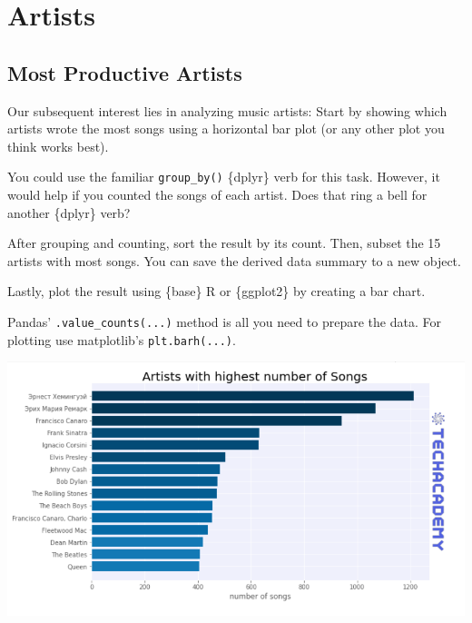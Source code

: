 \documentclass[
  11pt,
]{book}
\newenvironment{tips}[1]
  {
  \begin{itemize}
  \footnotesize
  \renewcommand{\labelitemi}{
    \raisebox{-.7\height}[0pt][0pt]{
      {\setkeys{Gin}{width=3em,keepaspectratio}
        \texttt{[image: images/\#1.png]}}
    }
  }
  \setlength{\fboxsep}{1em}
  \begin{rbox}
  \item
  }
  {
  \end{rbox}
  \end{itemize}
  }
\newenvironment{tipsp}[1]
  {
  \begin{itemize}
  \footnotesize
  \renewcommand{\labelitemi}{
    \raisebox{-.7\height}[0pt][0pt]{
      {\setkeys{Gin}{width=3em,keepaspectratio}
        \texttt{[image: images/\#1.png]}}
    }
  }
  \setlength{\fboxsep}{1em}
  \begin{pbox}
  \item
  }
  {
  \end{pbox}
  \end{itemize}
  }
\begin{document}
\hypertarget{artists}{%
\section{Artists}\label{artists}}

\hypertarget{most-productive-artists}{%
\subsection{Most Productive Artists}\label{most-productive-artists}}

Our subsequent interest lies in analyzing music artists: Start by showing which artists wrote the most songs using a horizontal bar plot (or any other plot you think works best).

\begin{tips}r

You could use the familiar \texttt{group\_by()} \{dplyr\} verb for this task. However, it would help if you counted the songs of each artist. Does that ring a bell for another \{dplyr\} verb?

After grouping and counting, sort the result by its count. Then, subset the 15 artists with most songs. You can save the derived data summary to a new object.

Lastly, plot the result using \{base\} R or \{ggplot2\} by creating a bar chart.

\end{tips}

\begin{tipsp}p

Pandas' \texttt{.value\_counts(...)} method is all you need to prepare the data.
For plotting use matplotlib's \texttt{plt.barh(...)}.

\end{tipsp}

\begin{center}\includegraphics[width=1\linewidth]{splots/artists_bar_chart} \end{center}
\end{document}
